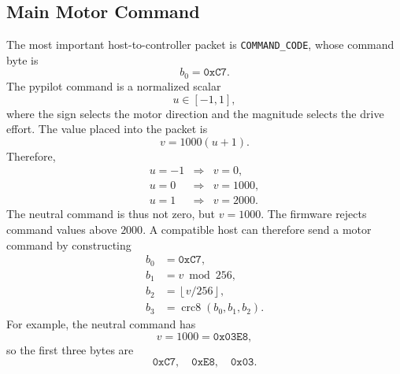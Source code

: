 \documentclass[10pt,twocolumn]{article}
\begin{document}
\subsection{Main Motor Command}
The most important host-to-controller packet is
\texttt{COMMAND\_CODE}, whose command byte is
\[
b_0 = \mathtt{0xC7}.
\]
The pypilot command is a normalized scalar
\[
u \in [-1,1],
\]
where the sign selects the motor direction and the magnitude selects the
drive effort.  The value placed into the packet is
\[
v = 1000(u+1).
\]
Therefore,
\[
\begin{array}{lll}
u=-1 &\Rightarrow& v=0,\\
u=0 &\Rightarrow& v=1000,\\
u=1 &\Rightarrow& v=2000.
\end{array}
\]
The neutral command is thus not zero, but \(v=1000\).  The firmware
rejects command values above \(2000\).  A compatible host can therefore
send a motor command by constructing
\[
\begin{aligned}
b_0 &= \mathtt{0xC7},\\
b_1 &= v \bmod 256,\\
b_2 &= \left\lfloor v/256 \right\rfloor,\\
b_3 &= \operatorname{crc8}(b_0,b_1,b_2).
\end{aligned}
\]
For example, the neutral command has
\[
v = 1000 = \mathtt{0x03E8},
\]
so the first three bytes are
\[
\mathtt{0xC7},\quad \mathtt{0xE8},\quad \mathtt{0x03}.
\]
\end{document}
